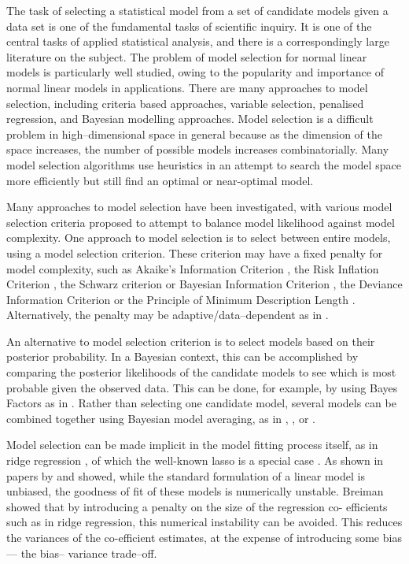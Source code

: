 \documentclass{amsart}[12pt]
\begin{document}
The task of selecting a statistical model from a set of candidate models given a data set is one
of the fundamental tasks of scientific inquiry. It is one of the central tasks of applied statistical
analysis, and there is a correspondingly large literature on the subject. The problem of model selection for
normal linear models is particularly well studied, owing to the popularity and importance of normal linear
models in applications.
There are many approaches to model selection, including criteria based approaches,
variable selection,
penalised regression,
and Bayesian modelling approaches. Model selection is a difficult problem in high--dimensional space in general
because as the dimension of the space increases, the number of possible models increases combinatorially.
Many model selection algorithms use heuristics in an attempt to search the model space more efficiently but
still find an optimal or near-optimal model.

Many approaches to model selection have been investigated, with various model selection criteria
proposed to attempt to balance model likelihood against model complexity. One approach to model selection is
to select between entire models, using a model selection criterion. These criterion may have a fixed penalty
for model complexity, such as Akaike's Information Criterion \citep{Akaike1974}, the Risk Inflation Criterion
\citep{Foster1994}, the Schwarz criterion or Bayesian Information Criterion \citep{Schwarz1978}, the Deviance
Information Criterion \citep{Spiegelhalter2016} or the Principle of Minimum Description Length
\citep{Hansen2001}. Alternatively, the penalty may be adaptive/data--dependent as in \citep{George2000}.

An alternative to model selection criterion is to select models based on their posterior probability. In a Bayesian context, this can be
accomplished by comparing the posterior likelihoods of the candidate models to see which is most probable
given the observed data. This can be done, for example, by using Bayes Factors as in \citep{Kass1993}. Rather
than selecting one candidate model, several models can be combined together using Bayesian model  averaging,
as in \citep{Hoeting1999}, \citep{Raftery1997}, \citep{Fernandez2001} or \citep{Papaspiliopoulos2016}.

Model selection can be made implicit in the model fitting process itself, as in ridge regression
\citep{Casella1980}, of which the well-known lasso is a special case \citep{Tibshirani1996}. As shown in
papers by \citep{Breiman1996} and \citep{Efron2013} showed, while  the standard formulation of a linear model
is unbiased, the goodness of fit of these models is numerically  unstable. Breiman showed that by introducing
a penalty on the size of the regression co- efficients such as  in ridge regression, this numerical
instability can be avoided. This reduces the variances of the co-efficient estimates, at the expense of
introducing some bias --- the bias-- variance trade--off.
\end{document}

